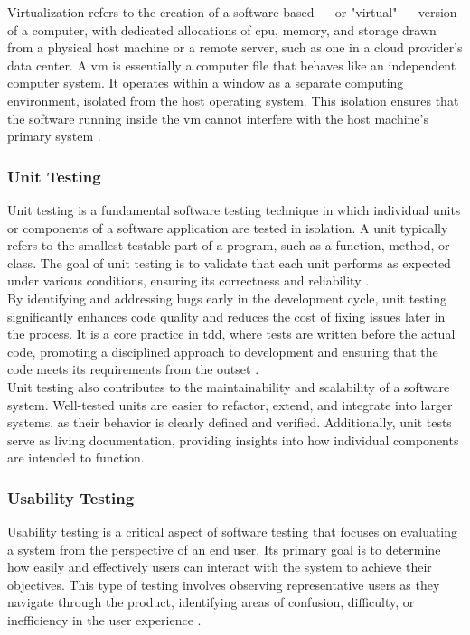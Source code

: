 {Virtualization refers to the creation of a software-based — or "virtual" — version of a computer, with dedicated allocations of \gls{cpu}, memory, and storage drawn from a physical host machine or a remote server, such as one in a cloud provider's data center. A \gls{vm} is essentially a computer file that behaves like an independent computer system. It operates within a window as a separate computing environment, isolated from the host operating system. This isolation ensures that the software running inside the \gls{vm} cannot interfere with the host machine’s primary system \cite{microsoft:virtual-machine}.

\subsubsection*{Unit Testing}
\label{subsubsec:unit-testing}

Unit testing is a fundamental software testing technique in which individual units or components of a software application are tested in isolation. A unit typically refers to the smallest testable part of a program, such as a function, method, or class. The goal of unit testing is to validate that each unit performs as expected under various conditions, ensuring its correctness and reliability \cite{geeksforgeeks:unit-test}. \\

By identifying and addressing bugs early in the development cycle, unit testing significantly enhances code quality and reduces the cost of fixing issues later in the process. It is a core practice in \gls{tdd}, where tests are written before the actual code, promoting a disciplined approach to development and ensuring that the code meets its requirements from the outset \cite{geeksforgeeks:unit-test}. \\

Unit testing also contributes to the maintainability and scalability of a software system. Well-tested units are easier to refactor, extend, and integrate into larger systems, as their behavior is clearly defined and verified. Additionally, unit tests serve as living documentation, providing insights into how individual components are intended to function.

\subsubsection*{Usability Testing}
\label{subsubsec:usability-testing}

Usability testing is a critical aspect of software testing that focuses on evaluating a system from the perspective of an end user. Its primary goal is to determine how easily and effectively users can interact with the system to achieve their objectives. This type of testing involves observing representative users as they navigate through the product, identifying areas of confusion, difficulty, or inefficiency in the user experience \cite{geeksforgeeks:user-test}. \\

}
